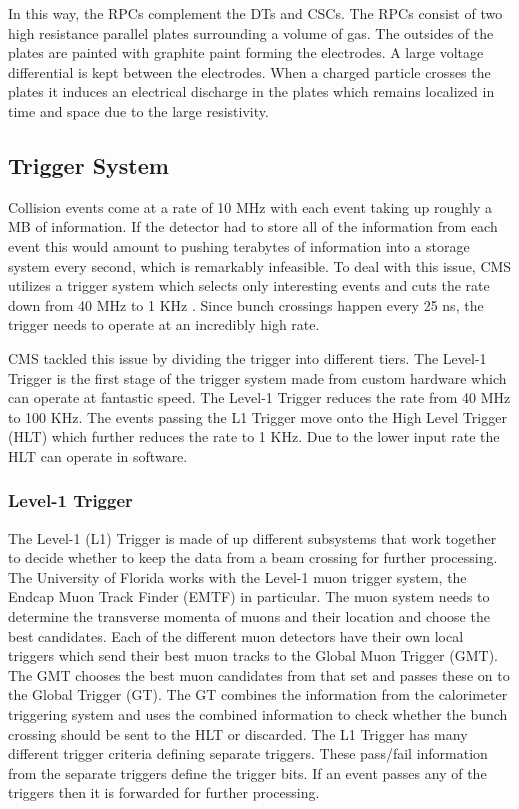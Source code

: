 In this way, the RPCs complement the DTs and CSCs. The RPCs consist of two high resistance parallel plates surrounding a volume of gas. The outsides of the plates are painted with graphite paint forming the electrodes. A large voltage differential is kept between the electrodes. When a charged particle crosses the plates it induces an electrical discharge in the plates which remains localized in time and space due to the large resistivity.

\subsection{Trigger System}
Collision events come at a rate of 10 MHz with each event taking up roughly a MB of information. If the detector had to store all of the information from each event this would amount to pushing terabytes of information into a storage system every second, which is remarkably infeasible. To deal with this issue, CMS utilizes a trigger system which selects only interesting events and cuts the rate down from 40 MHz to 1 KHz \cite{cmsexp}. Since bunch crossings happen every 25 ns, the trigger needs to operate at an incredibly high rate.

CMS tackled this issue by dividing the trigger into different tiers. The Level-1 Trigger is the first stage of the trigger system made from custom hardware which can operate at fantastic speed. The Level-1 Trigger reduces the rate from 40 MHz to 100 KHz. The events passing the L1 Trigger move onto the High Level Trigger (HLT) which further reduces the rate to 1 KHz. Due to the lower input rate the HLT can operate in software.

\subsubsection{Level-1 Trigger}

The Level-1 (L1) Trigger is made of up different subsystems that work together to decide whether to keep the data from a beam crossing for further processing. The University of Florida works with the Level-1 muon trigger system, the Endcap Muon Track Finder (EMTF) in particular. The muon system needs to determine the transverse momenta of muons and their location and choose the best candidates. Each of the different muon detectors have their own local triggers which send their best muon tracks to the Global Muon Trigger (GMT). The GMT chooses the best muon candidates from that set and passes these on to the Global Trigger (GT). The GT combines the information from the calorimeter triggering system and uses the combined information to check whether the bunch crossing should be sent to the HLT or discarded. The L1 Trigger has many different trigger criteria defining separate triggers. These pass/fail information from the separate triggers define the trigger bits. If an event passes any of the triggers then it is forwarded for further processing.

